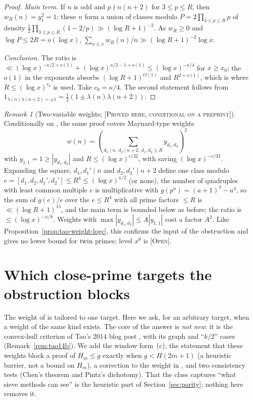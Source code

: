 \documentclass[11pt]{amsart}
\theoremstyle{definition}
\theoremstyle{remark}
\newtheorem{remark}[theorem]{Remark}
\newcommand{\lbl}[1]{\textup{\textsc{[#1]}}}
\begin{document}
\begin{proof}
\emph{Main term.} If $n$ is odd and $p\nmid n(n+2)$ for $3\le p\le R$, then
$w_R(n)=y_1^2=1$; these $n$ form a union of classes modulo
$P=2\prod_{3\le p\le R}p$ of density
$\frac12\prod_{3\le p\le R}(1-2/p)\gg(\log R+1)^{-2}$. As $w_R\ge0$ and
$\log P\le2R=o(\log x)$, $\sum_{n\le x}w_R(n)/n\gg(\log R+1)^{-2}\log x$.

\emph{Conclusion.} The ratio is
$\ll(\log x)^{-\kappa/2+o(1)}+(\log x)^{\kappa/2-1+o(1)}\le(\log x)^{-\kappa/4}$
for $x\ge x_0$; the $o(1)$ in the exponents absorbs $(\log R+1)^{O(1)}$ and
$R^{2+o(1)}$, which is where $R\le(\log x)^{c_0}$ is used. Take $c_0=\kappa/4$.
The second statement follows from
$1_{\lambda(n)\lambda(n+2)=\pm1}=\frac12(1\pm\lambda(n)\lambda(n+2))$.
\end{proof}

\begin{remark}[Two-variable weights; \lbl{Proved here, conditional on a preprint}]\label{rem:maynard-logc}
Conditionally on \cite[Theorem~3.1]{TT25}, the same proof covers Maynard-type weights
\[w(n)=\left(\sum_{d_1\mid n,\ d_2\mid n+2,\ d_1,d_2\le R}y_{d_1,d_2}\right)^2\]
with $y_{1,1}=1\ge|y_{d_1,d_2}|$ and $R\le(\log x)^{c/32}$, with saving
$(\log x)^{-c/32}$. Expanding the square, $d_1,d_1'\mid n$ and
$d_2,d_2'\mid n+2$ define one class modulo
$e=[d_1,d_2,d_1',d_2']\le R^4\le(\log x)^{\kappa/2}$ (or none), the number of
quadruples with least common multiple $e$ is multiplicative with
$g(p^a)=(a+1)^4-a^4$, so the sum of $g(e)/e$ over the $e\le R^4$ with all prime factors $\le R$ is $\ll(\log R+1)^{15}$, and the main
term is bounded below as before; the ratio is $\le(\log x)^{-\kappa/8}$.
Weights with $\max|y_{d_1,d_2}|\le A|y_{1,1}|$ cost a factor $A^2$. Like
Proposition~\ref{prop:tao-weight-logc}, this confirms the input of the
obstruction and gives no lower bound for twin primes; level $x^{\theta}$ is
\lbl{Open}.
\end{remark}

\section{Which close-prime targets the obstruction blocks}\label{sec:bip}

The weight of \cite[\S8]{PM8b} is tailored to one target. Here we ask, for an
arbitrary target, when a weight of the same kind exists. The core of the
answer is \emph{not new}: it is the convex-hull criterion of Tao's 2014 blog
post \cite{Tao14b}, with its graph and ``$k/2$'' cases (Remark~\ref{rem:tao14b}).
We add the window form~(c), the statement that these weights block a proof of
$H_m\le g$ exactly when $g<H(2m+1)$ (a heuristic barrier, not a bound on
$H_m$), a correction to the weight in \cite[Remark~8.1]{PM8b}, and two
consistency tests (Chen's theorem and Pintz's dichotomy). That the class
captures ``what sieve methods can see'' is the heuristic part of
Section~\ref{sec:parity}; nothing here removes it.
\end{document}
